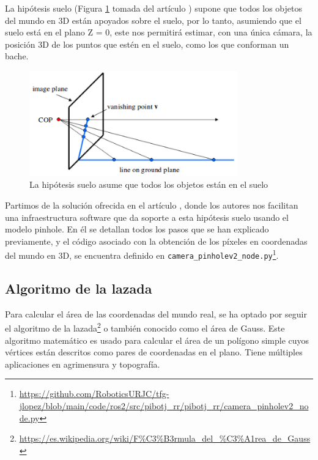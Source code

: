 
La hipótesis suelo (Figura \ref{fig:hipotesissuelo} tomada del artículo \cite{vega19d}) supone que todos los objetos del mundo en 3D están apoyados sobre el suelo, por lo tanto, asumiendo que el suelo está en el plano Z = 0, este nos permitirá estimar, con una única cámara, la posición 3D de los puntos que estén en el suelo, como los que conforman un bache.

 \begin{figure} [h!]
	\begin{center}
		\includegraphics[width=9cm]{figs/cap6/hipotesissuelo.png}
	\end{center}
	\caption{La hipótesis suelo asume que todos los objetos están en el suelo}
	\label{fig:hipotesissuelo}
\end{figure}


Partimos de la solución ofrecida en el artículo \cite{vega19d}, donde los autores nos facilitan una infraestructura software que da soporte a esta hipótesis suelo usando el modelo pinhole. En él se detallan todos los pasos que se han explicado previamente, y el código asociado con la obtención de los píxeles en coordenadas del mundo en 3D, se encuentra definido en \verb|camera_pinholev2_node.py|\footnote{\url{https://github.com/RoboticsURJC/tfg-jlopez/blob/main/code/ros2/src/pibotj_rr/pibotj_rr/camera_pinholev2_node.py}}.

\subsection{Algoritmo de la lazada}
\label{subsec:softwareshoelace}

Para calcular el área de las coordenadas del mundo real, se ha optado por seguir el algoritmo de la lazada\footnote{\url{https://es.wikipedia.org/wiki/F\%C3\%B3rmula_del_\%C3\%A1rea_de_Gauss}} o también conocido como el área de Gauss. Este algoritmo matemático es usado para calcular el área de un polígono simple cuyos vértices están descritos como pares de coordenadas en el plano. Tiene múltiples aplicaciones en agrimensura y topografía.

